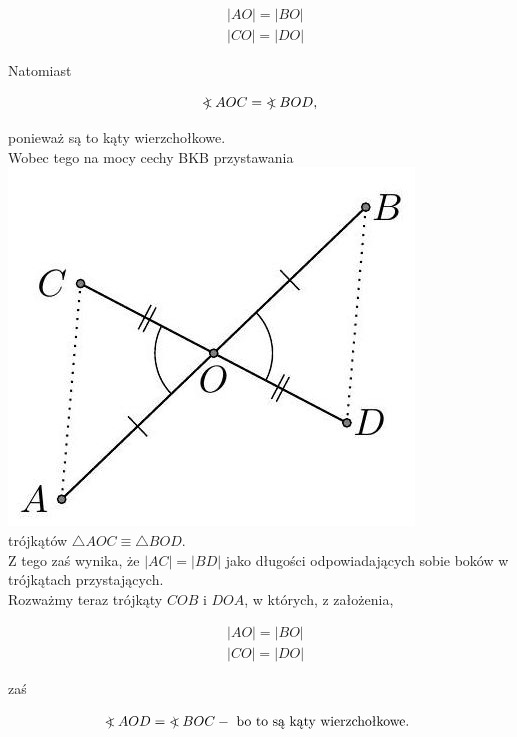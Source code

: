 \documentclass[10pt]{article}
\newcommand\Varangle{\mathop{{<\!\!\!\!\!\text{\small)}}\:}\nolimits}
\begin{document}
\[
\begin{aligned}
& |A O|=|B O| \\
& |C O|=|D O|
\end{aligned}
\]

Natomiast

\[
\Varangle A O C=\Varangle B O D,
\]

ponieważ są to kąty wierzchołkowe.\\
Wobec tego na mocy cechy BKB przystawania\\
\includegraphics[max width=\textwidth, center]{2024_11_21_71f62bd117d375398909g-058(2)}\\
trójkątów \(\triangle A O C \equiv \triangle B O D\).\\
Z tego zaś wynika, że \(|A C|=|B D|\) jako długości odpowiadających sobie boków w trójkątach przystających.\\
Rozważmy teraz trójkąty \(C O B\) i \(D O A\), w których, z założenia,

\[
\begin{aligned}
& |A O|=|B O| \\
& |C O|=|D O|
\end{aligned}
\]

zaś

\[
\Varangle A O D=\Varangle B O C-\text { bo to są kąty wierzchołkowe. }
\]
\end{document}
